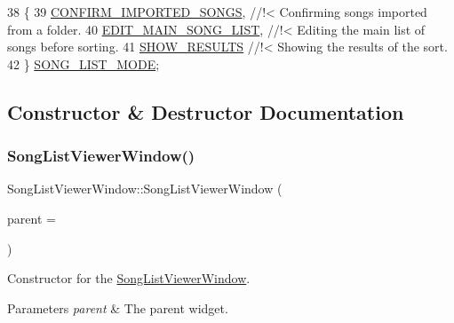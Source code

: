 \begin{DoxyCode}
38         \{
39             \mbox{\hyperlink{class_song_list_viewer_window_a6f23a68c416173f6b571a2cc4990a927a9847037eeae7688b9cddf8700d425332}{CONFIRM\_IMPORTED\_SONGS}}, \textcolor{comment}{//!< Confirming songs imported from a folder.}
40 \textcolor{comment}{}            \mbox{\hyperlink{class_song_list_viewer_window_a6f23a68c416173f6b571a2cc4990a927ad119fc74405f78aff7ed2efda3eb7b74}{EDIT\_MAIN\_SONG\_LIST}}, \textcolor{comment}{//!< Editing the main list of songs before sorting.}
41 \textcolor{comment}{}            \mbox{\hyperlink{class_song_list_viewer_window_a6f23a68c416173f6b571a2cc4990a927a7fbcaf0d5c1145332e50928f877040b4}{SHOW\_RESULTS}} \textcolor{comment}{//!< Showing the results of the sort.}
42 \textcolor{comment}{}        \} \mbox{\hyperlink{class_song_list_viewer_window_a6f23a68c416173f6b571a2cc4990a927}{SONG\_LIST\_MODE}};
\end{DoxyCode}


\subsection{Constructor \& Destructor Documentation}
\mbox{\label{class_song_list_viewer_window_a5691d305c3ccaeea7e0213c1722c5c38}} 
\subsubsection{\texorpdfstring{Song\+List\+Viewer\+Window()}{SongListViewerWindow()}}
{\footnotesize\ttfamily Song\+List\+Viewer\+Window\+::\+Song\+List\+Viewer\+Window (\begin{DoxyParamCaption}\item[{Q\+Widget $\ast$}]{parent = {} }\end{DoxyParamCaption})\hspace{0.3cm}{\ttfamily [explicit]}}



Constructor for the \mbox{\hyperlink{class_song_list_viewer_window}{Song\+List\+Viewer\+Window}}. 


\begin{DoxyParams}{Parameters}
{\em parent} & The parent widget. \\
\hline
\end{DoxyParams}


